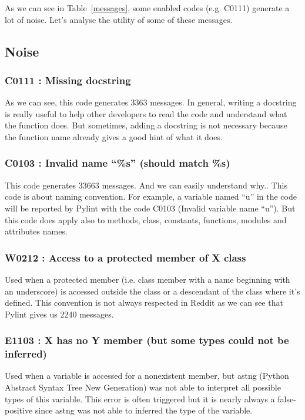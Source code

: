 \documentclass[11pt, a4paper]{article}
\newcommand{\pyl}{\textsf{Pylint}}
\begin{document}
\newpage
As we can see in Table~\ref{messages}, some enabled codes (e.g. C0111) generate a lot of noise. 
Let's analyse the utility of some of these messages.

\subsection*{Noise}
\subsubsection*{C0111 : Missing docstring}

As we can see, this code generates 3363 messages.
In general, writing a docstring is really useful to help other developers to read the code and understand what the function does.
But sometimes, adding a docstring is not necessary because the function name already gives a good hint of what it does.


\subsubsection*{C0103 : Invalid name ``\%s''  (should match \%s) }

This code generates 33663 messages. 
And we can easily understand why.. This code is about naming convention.
For example, a variable named ``u'' in the code will be reported by \pyl{} with the code C0103 (Invalid variable name ``u'').
But this code does apply also to methods, class, constants, functions, modules and attributes names.

\subsubsection*{W0212 : Access to a protected member of X class}

Used when a protected member (i.e. class member with a name beginning with an underscore) is accessed outside the class or a descendant of the class where it's defined.
This convention is not always respected in Reddit as we can see that \pyl{} gives us 2240 messages.


\subsubsection*{E1103 : X has no Y member (but some types could not be inferred)}

Used when a variable is accessed for a nonexistent member, but astng (Python Abstract Syntax Tree New Generation) was not able to interpret all possible types of this variable.
This error is often triggered but it is nearly always a false-positive since astng was not able to inferred the type of the variable.
\end{document}
